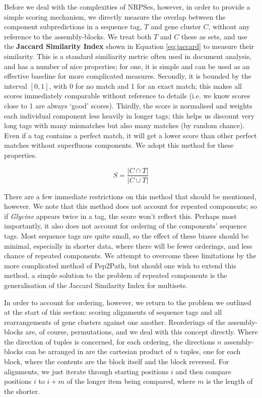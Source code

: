 \documentclass{l4proj}
\newcommand{\cit}[1]{\citep{#1}}
\newcommand{\jaccard}{
	\begin{equation} \label{eq:jaccard}
		S = \dfrac{|C\cap{T}|}{|C\cup{T}|}
	\end{equation}
}
\begin{document}
Before we deal with the complexities of NRPSes, however, in order to provide a simple scoring mechanism, we directly measure the overlap between the component subpredictions in a sequence tag, \(T\) and gene cluster \(C\), without any reference to the assembly-blocks. We treat both \(T\) and \(C\) these as sets, and use the \textbf{Jaccard Similarity Index} \cit{jaccard} shown in Equation \ref{eq:jaccard} to measure their similarity. This is a standard similiarity metric often used in document analysis, and has a number of nice properties; for one, it is simple and can be used as an effective baseline for more complicated measures. Secondly, it is bounded by the interval \([0, 1]\), with 0 for no match and 1 for an exact match; this makes all scores immediately comparable without reference to details (i.e. we know scores close to 1 are always `good' scores). Thirdly, the score is normalised and weights each individual component less heavily in longer tags; this helps us discount very long tags with many mismatches but also many matches (by random chance). Even if a tag contains a perfect match, it will get a lower score than other perfect matches without superfluous components. We adopt this method for these properties.

\jaccard

There are a few immediate restrictions on this method that should be mentioned, however. We note that this method does not account for repeated components; so if \textit{Glycine} appears twice in a tag, the score won't reflect this. Perhaps most importantly, it also does not account for ordering of the components' sequence tags. Most sequence tags are quite small, so the effect of these biases should be minimal, especially in shorter data, where there will be fewer orderings, and less chance of repeated components. We attempt to overcome these limitations by the more complicated method of Pep2Path, but should one wish to extend this method, a simple solution to the problem of repeated components is the generalisation of the Jaccard Similarity Index for multisets.

In order to account for ordering, however, we return to the problem we outlined at the start of this section: scoring alignments of sequence tags and all rearrangements of gene clusters against one another. Reorderings of the assembly-blocks are, of course, permutations, and we deal with this concept directly. Where the direction of tuples is concerned, for each ordering, the directions \(n\) assembly-blocks can be arranged in are the cartesian product of \(n\) tuples, one for each block, where the contents are the block itself and the block reversed. For alignments, we just iterate through starting positions \(i\) and then compare positions \(i\) to \(i + m\) of the longer item being compared, where \(m\) is the length of the shorter.
\end{document}
